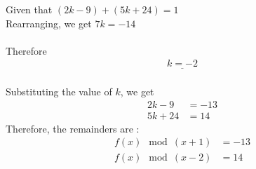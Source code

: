 \documentclass[11pt, oneside, twocolumn]{amsart}   	%
\begin{document}
Given that $(2k - 9) + (5k + 24) = 1$
	\\	
Rearranging, we get $7k = -14$ \\
		\\
Therefore \begin{align} \underline{k = -2} \end{align}
		\\
Substituting the value of $k$, we get
	\begin{align}
		2k - 9 &= -13 \\
		5k + 24 &= 14
\end{align}
Therefore, the remainders are :
\begin{align}
	f(x) \mod (x + 1) &= -13 \\
	f(x) \mod (x - 2) &= 14
\end{align}
\\
\end{document}
